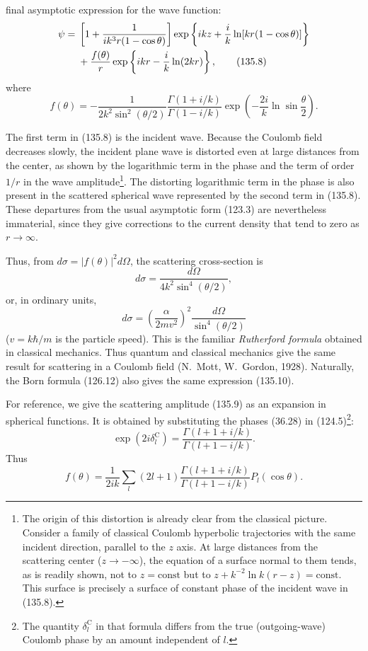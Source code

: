 final asymptotic expression for the wave function:
\begin{align}
 \psi={}&\left[1+\frac{1}{ik^3r(1-\cos\theta)}\right]
 \exp\left\{ikz+\frac{i}{k}\ln[kr(1-\cos\theta)]\right\}\notag\\
 &+\frac{f(\theta)}{r}\exp\left\{ikr-\frac{i}{k}\ln(2kr)\right\},
 \tag{135.8}
\end{align}
where
\begin{equation}
 f(\theta)=-\frac{1}{2k^2\sin^2(\theta/2)}
 \frac{\Gamma(1+i/k)}{\Gamma(1-i/k)}
 \exp\left(-\frac{2i}{k}\ln\sin\frac{\theta}{2}\right).
 \tag{135.9}
\end{equation}

The first term in (135.8) is the incident wave. Because the Coulomb field
decreases slowly, the incident plane wave is distorted even at large
distances from the center, as shown by the logarithmic term in the phase and
the term of order $1/r$ in the wave amplitude\footnote{The origin of this
distortion is already clear from the classical picture. Consider a family of
classical Coulomb hyperbolic trajectories with the same incident direction,
parallel to the $z$ axis. At large distances from the scattering center
($z\to-\infty$), the equation of a surface normal to them tends, as is readily
shown, not to $z=\mathrm{const}$ but to
$z+k^{-2}\ln k(r-z)=\mathrm{const}$. This surface is precisely a surface of
constant phase of the incident wave in (135.8).}. The distorting logarithmic
term in the phase is also present in the scattered spherical wave represented
by the second term in (135.8). These departures from the usual asymptotic
form (123.3) are nevertheless immaterial, since they give corrections to the
current density that tend to zero as $r\to\infty$.

Thus, from $d\sigma=|f(\theta)|^2d\Omega$, the scattering cross-section is
\[
 d\sigma=\frac{d\Omega}{4k^2\sin^4(\theta/2)},
\]
or, in ordinary units,
\begin{equation}
 d\sigma=\left(\frac{\alpha}{2mv^2}\right)^2
 \frac{d\Omega}{\sin^4(\theta/2)}
 \tag{135.10}
\end{equation}
($v=k\hbar/m$ is the particle speed). This is the familiar
\emph{Rutherford formula} obtained in classical mechanics. Thus quantum and
classical mechanics give the same result for scattering in a Coulomb field
(N.~Mott, W.~Gordon, 1928). Naturally, the Born formula (126.12) also gives
the same expression (135.10).

For reference, we give the scattering amplitude (135.9) as an expansion in
spherical functions. It is obtained by substituting the phases (36.28) in
(124.5)\footnote{The quantity $\delta_l^{\mathrm C}$ in that formula differs
from the true (outgoing-wave) Coulomb phase by an amount independent of $l$.}:
\begin{equation}
 \exp(2i\delta_l^{\mathrm C})=\frac{\Gamma(l+1+i/k)}{\Gamma(l+1-i/k)}.
 \tag{135.11}
\end{equation}
Thus
\begin{equation}
 f(\theta)=\frac{1}{2ik}\sum_l(2l+1)
 \frac{\Gamma(l+1+i/k)}{\Gamma(l+1-i/k)}P_l(\cos\theta).
 \tag{135.12}
\end{equation}

